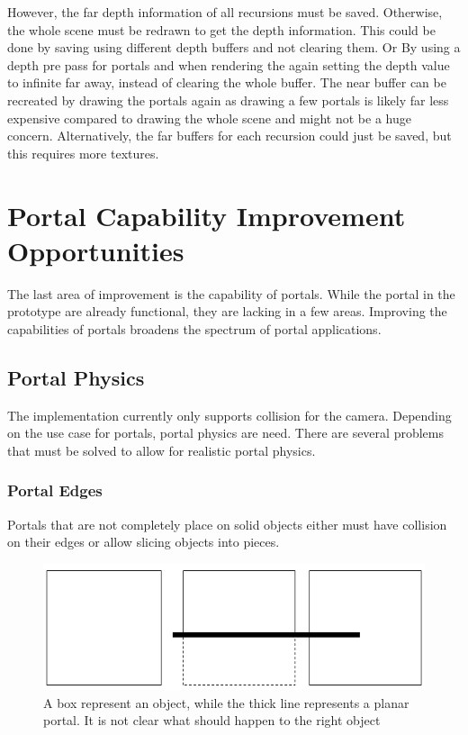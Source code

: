 However, the far depth information of all recursions must be saved. Otherwise, the whole scene must be redrawn to get the depth information. This could be done by saving using different depth buffers and not clearing them. Or By using a depth pre pass for portals and when rendering the again setting the depth value to infinite far away, instead of clearing the whole buffer. The near buffer can be recreated by drawing the portals again as drawing a few portals is likely far less expensive compared to drawing the whole scene and might not be a huge concern. Alternatively, the far buffers for each recursion could just be saved, but this requires more textures.


\chapter{Portal Capability Improvement Opportunities}
The last area of improvement is the capability of portals. While the portal in the prototype are already functional, they are lacking in a few areas. Improving the capabilities of portals broadens the spectrum of portal applications. 


\section{Portal Physics}
\label{section:portalphysics}
The implementation currently only supports collision for the camera. Depending on the use case for portals, portal physics are need. There are several problems that must be solved to allow for realistic portal physics.

\subsection{Portal Edges}
Portals that are not completely place on solid objects either must have collision on their edges or allow slicing objects into pieces.

\begin{figure}[h]
	\centering
	\includegraphics[width=\linewidth]{images/edgecollision.png}
	\caption{A box represent an object, while the thick line represents a planar portal. It is not clear what should happen to the right object}
	\label{fig:edgecollision}
\end{figure}

